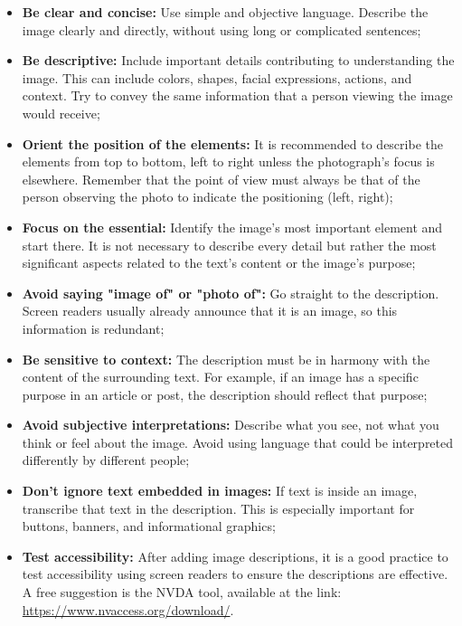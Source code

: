 \documentclass[12pt]{article}
\begin{document}
\begin{itemize}
    \item \textbf{Be clear and concise:} Use simple and objective language. Describe the image clearly and directly, without using long or complicated sentences;
    \item \textbf{Be descriptive:} Include important details contributing to understanding the image. This can include colors, shapes, facial expressions, actions, and context. Try to convey the same information that a person viewing the image would receive;
    \item \textbf{Orient the position of the elements:} It is recommended to describe the elements from top to bottom, left to right unless the photograph's focus is elsewhere. Remember that the point of view must always be that of the person observing the photo to indicate the positioning (left, right);
    \item \textbf{Focus on the essential:} Identify the image's most important element and start there. It is not necessary to describe every detail but rather the most significant aspects related to the text's content or the image's purpose;
    \item \textbf{Avoid saying "image of" or "photo of":} Go straight to the description. Screen readers usually already announce that it is an image, so this information is redundant;
    \item \textbf{Be sensitive to context:} The description must be in harmony with the content of the surrounding text. For example, if an image has a specific purpose in an article or post, the description should reflect that purpose;
    \item \textbf{Avoid subjective interpretations:} Describe what you see, not what you think or feel about the image. Avoid using language that could be interpreted differently by different people;
    \item \textbf{Don't ignore text embedded in images:} If text is inside an image, transcribe that text in the description. This is especially important for buttons, banners, and informational graphics;
    \item \textbf{Test accessibility:} After adding image descriptions, it is a good practice to test accessibility using screen readers to ensure the descriptions are effective. A free suggestion is the NVDA tool, available at the link: \url{https://www.nvaccess.org/download/}.
    
\end{itemize}
\end{document}
